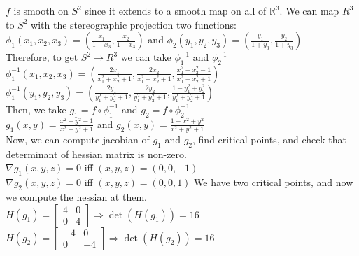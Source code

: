 \documentclass[]{article}
\newcommand{\R}{\mathbb{R}}
\newcommand{\imply}{\Rightarrow}
\begin{document}
$f$ is smooth on $ S^2 $ since it extends to a smooth map on all of $\R^3$. We can map $R^3$ to $S^2$ with the stereographic projection two functions:\\
$
	\phi_1(x_1,x_2,x_3) = (\frac{x_1}{1-x_3}, \frac{x_2}{1-x_3} ) 
$
and
$
	\phi_2(y_1,y_2,y_3) = (\frac{y_1}{1+y_3},\frac{y_2}{1+y_3})
$\\
Therefore, to get $S^2 \to R^3$ we can take $\phi_1^{-1}$ and $\phi_2^{-1}$ \\
$
	\phi_1^{-1}(x_1,x_2,x_3) = (\frac{2x_1}{x_1^2+x_2^2+1}, \frac{2x_2}{x_1^2+x_2^2+1}, \frac{x_1^2+x_2^2-1}{x_1^2+x_2^2+1})
$\\
$
	\phi_1^{-1}(y_1,y_2,y_3) = (\frac{2y_1}{y_1^2+y_2^2+1}, \frac{2y_2}{y_1^2+y_2^2+1}, \frac{1-y_1^2+y_2^2}{y_1^2+y_2^2+1})
$\\
Then, we take $g_1 = f \circ \phi_1^{-1}$ and $g_2 = f \circ \phi_2^{-1}$ \\
$
	g_1(x,y) =  \frac{x^2+y^2-1}{x^2+y^2+1}
$
and
$
	g_2(x,y) = \frac{1-x^2+y^2}{x^2+y^2+1}
$ \\
Now, we can compute jacobian of $g_1$ and $g_2$, find critical points, and check that determinant of hessian matrix is non-zero. \\
$
	\nabla g_1(x,y,z) = 0$ iff $(x,y,z) = (0,0,-1)
$\\
$
	\nabla g_2(x,y,z) = 0$ iff $ (x,y,z) = (0,0,1)
$
We have two critical points, and now we compute the hessian at them.\\

$
	H(g_1) = \begin{bmatrix} 4 & 0 \\ 0 & 4 \end{bmatrix}
	\imply \det(H(g_1)) = 16
$ \\

$
	H(g_2) = \begin{bmatrix} -4 & 0 \\ 0 & -4 \end{bmatrix}
	\imply \det(H(g_2)) =  16
$ \\ 
\end{document}
